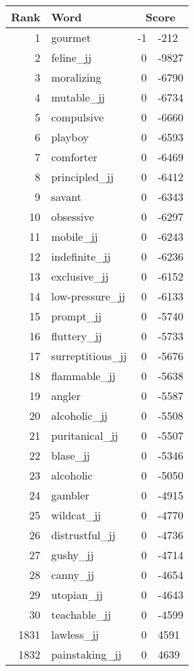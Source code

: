 \begin{longtable}[!htbp]{| rlr@{.}l |}
    \hline
    \textbf{Rank} & \textbf{Word} & \multicolumn{2}{c|}{\textbf{Score}} \\
    \hline
    \endhead
    1 & gourmet & -1 & -212 \\
    2 & feline\_jj & 0 & -9827 \\
    3 & moralizing & 0 & -6790 \\
    4 & mutable\_jj & 0 & -6734 \\
    5 & compulsive & 0 & -6660 \\
    6 & playboy & 0 & -6593 \\
    7 & comforter & 0 & -6469 \\
    8 & principled\_jj & 0 & -6412 \\
    9 & savant & 0 & -6343 \\
    10 & obsessive & 0 & -6297 \\
    11 & mobile\_jj & 0 & -6243 \\
    12 & indefinite\_jj & 0 & -6236 \\
    13 & exclusive\_jj & 0 & -6152 \\
    14 & low-pressure\_jj & 0 & -6133 \\
    15 & prompt\_jj & 0 & -5740 \\
    16 & fluttery\_jj & 0 & -5733 \\
    17 & surreptitious\_jj & 0 & -5676 \\
    18 & flammable\_jj & 0 & -5638 \\
    19 & angler & 0 & -5587 \\
    20 & alcoholic\_jj & 0 & -5508 \\
    21 & puritanical\_jj & 0 & -5507 \\
    22 & blase\_jj & 0 & -5346 \\
    23 & alcoholic & 0 & -5050 \\
    24 & gambler & 0 & -4915 \\
    25 & wildcat\_jj & 0 & -4770 \\
    26 & distrustful\_jj & 0 & -4736 \\
    27 & gushy\_jj & 0 & -4714 \\
    28 & canny\_jj & 0 & -4654 \\
    29 & utopian\_jj & 0 & -4643 \\
    30 & teachable\_jj & 0 & -4599 \\
    1831 & lawless\_jj & 0 & 4591 \\
    1832 & painstaking\_jj & 0 & 4639 \\

\end{longtable}
